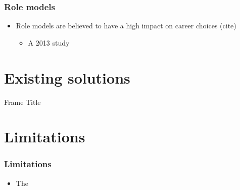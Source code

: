 \documentclass{beamer}
\begin{document}
\begin{frame}
	\frametitle{Role models}
	\begin{itemize}
		\item Role models are believed to have a high impact on career choices (cite)
		\begin{itemize}
			\item A 2013 study 
			
		\end{itemize}
	\end{itemize}
\end{frame}

\section{Existing solutions}
\begin{frame}{Frame Title}
\end{frame}


\section{Limitations}
\begin{frame}
	\frametitle{Limitations}
	\begin{itemize}
		\item The 
	\end{itemize}
\end{frame}
\end{document}
